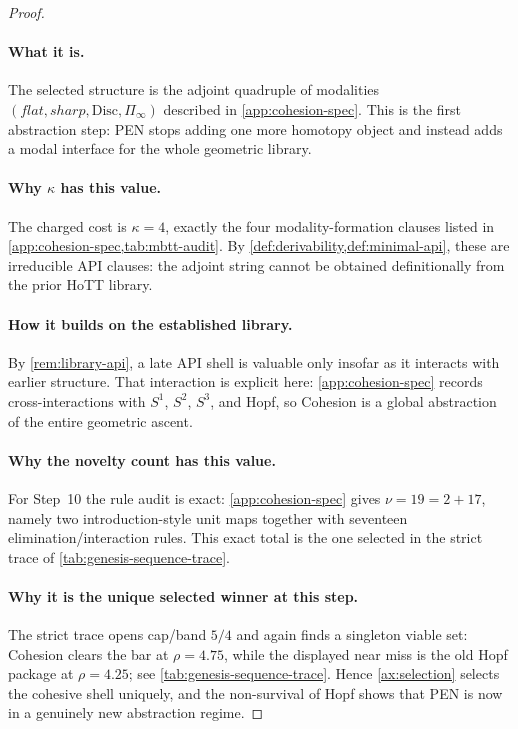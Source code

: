 \documentclass[11pt,a4paper]{article}
\def\flat{flat}%
\def\sharp{sharp}%
\theoremstyle{plain}
\theoremstyle{definition}
\theoremstyle{remark}
\newcommand{\Disc}{\mathrm{Disc}}
\begin{document}
\begin{proof}
\paragraph{What it is.}
The selected structure is the adjoint quadruple of modalities
$(\flat,\sharp,\Disc,\Pi_{\infty})$ described in
\cref{app:cohesion-spec}.
This is the first abstraction step: PEN stops adding one more homotopy object
and instead adds a modal interface for the whole geometric library.

\paragraph{Why $\kappa$ has this value.}
The charged cost is $\kappa=4$, exactly the four modality-formation clauses
listed in \cref{app:cohesion-spec,tab:mbtt-audit}.
By \cref{def:derivability,def:minimal-api}, these are irreducible API clauses:
the adjoint string cannot be obtained definitionally from the prior HoTT
library.

\paragraph{How it builds on the established library.}
By \cref{rem:library-api}, a late API shell is valuable only insofar as it
interacts with earlier structure.
That interaction is explicit here:
\cref{app:cohesion-spec} records cross-interactions with $S^1$, $S^2$, $S^3$,
and Hopf, so Cohesion is a global abstraction of the entire geometric ascent.

\paragraph{Why the novelty count has this value.}
For Step~10 the rule audit is exact:
\cref{app:cohesion-spec} gives $\nu=19=2+17$, namely two introduction-style unit
maps together with seventeen elimination/interaction rules.
This exact total is the one selected in the strict trace of
\cref{tab:genesis-sequence-trace}.

\paragraph{Why it is the unique selected winner at this step.}
The strict trace opens cap/band $5/4$ and again finds a singleton viable set:
Cohesion clears the bar at $\rho=4.75$, while the displayed near miss is the old
Hopf package at $\rho=4.25$; see \cref{tab:genesis-sequence-trace}.
Hence \cref{ax:selection} selects the cohesive shell uniquely, and the
non-survival of Hopf shows that PEN is now in a genuinely new abstraction
regime.
\end{proof}
\end{document}
